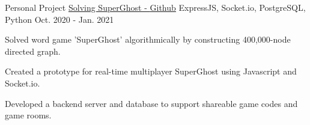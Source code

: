 \begin{cventries}
  \cventry
    {Personal Project} %
    {\href{https://github.com/danielq987/superghost-explorer}{Solving SuperGhost - \underline{Github}}} %
    {ExpressJS, Socket.io, PostgreSQL, Python} %
    {Oct. 2020 - Jan. 2021} %
    {
      \begin{cvitems} %
        \item {Solved word game 'SuperGhost' algorithmically by constructing 400,000-node directed graph.}
        \item {Created a prototype for real-time multiplayer SuperGhost using Javascript and Socket.io.}
        \item {Developed a backend server and database to support shareable game codes and game rooms.}
      \end{cvitems}
    }


\end{cventries}
